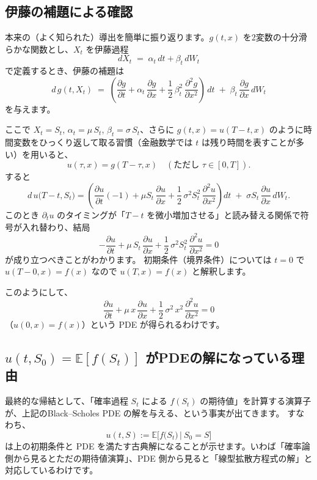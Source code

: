 \documentclass[a4paper]{jsarticle}
\begin{document}
\subsection{伊藤の補題による確認}  

本来の（よく知られた）導出を簡単に振り返ります。$g(t,x)$ を2変数の十分滑らかな関数とし、$X_t$ を伊藤過程  
\[  
  dX_t \;=\; \alpha_t\,dt + \beta_t\,dW_t  
\]  
で定義するとき、伊藤の補題は  
\[  
  d\,g(t,X_t)  
  \;=\;  
  \left(  
    \frac{\partial g}{\partial t}  
    + \alpha_t\,\frac{\partial g}{\partial x}  
    + \frac{1}{2}\,\beta_t^2\,\frac{\partial^2 g}{\partial x^2}  
  \right)\,dt  
  \;+\;  
  \beta_t\,\frac{\partial g}{\partial x}\,dW_t  
\]  
を与えます。  

ここで $X_t=S_t$, $\alpha_t = \mu\,S_t$, $\beta_t=\sigma\,S_t$、さらに $g(t,x)=u(T-t,x)$ のように時間変数をひっくり返して取る習慣（金融数学では $t$ は残り時間を表すことが多い）を用いると、  
\[  
  u(\tau,x)  
  =  
  g(T-\tau,x)  
  \quad(\text{ただし } \tau \in [0,T]).  
\]  
すると  
\[  
  d\,u\bigl(T-t,S_t\bigr)  
  =  
  \left(  
    \frac{\partial u}{\partial t}(-1)  
    + \mu S_t\,\frac{\partial u}{\partial x}  
    + \frac12\,\sigma^2 S_t^2\,\frac{\partial^2 u}{\partial x^2}  
  \right) dt  
  \;+\;  
  \sigma S_t \,\frac{\partial u}{\partial x}\,dW_t.  
\]  
このとき $\partial_t u$ のタイミングが「$T-t$ を微小増加させる」と読み替える関係で符号が入れ替わり、結局  
\[  
  - \frac{\partial u}{\partial t}  
  + \mu\,S_t \,\frac{\partial u}{\partial x}  
  + \frac{1}{2}\,\sigma^2 S_t^2\,\frac{\partial^2 u}{\partial x^2}  
  = 0  
\]  
が成り立つべきことがわかります。  
初期条件（境界条件）については $t=0$ で $u(T-0,x)=f(x)$ なので $u(T,x)=f(x)$ と解釈します。  

このようにして、  
\[  
  \frac{\partial u}{\partial t}  
  +   
  \mu\, x \,\frac{\partial u}{\partial x}  
  +  
  \frac12\,\sigma^2\,x^2\,\frac{\partial^2 u}{\partial x^2}  
  = 0  
\]  
（$u(0,x)=f(x)$）という PDE が得られるわけです。  

\subsection{$u(t,S_0)=\mathbb{E}[f(S_t)]$ がPDEの解になっている理由}  

最終的な帰結として、「確率過程 $S_t$ による $f(S_t)$ の期待値」を計算する演算子が、上記のBlack--Scholes PDE の解を与える、という事実が出てきます。  
すなわち、  
\[  
  u(t,S)   
  :=   
  \mathbb{E}\bigl[f\bigl(S_{t}\bigr)\,\big|\ S_0=S\bigr]  
\]  
は上の初期条件と PDE を満たす古典解になることが示せます。いわば「確率論側から見るとただの期待値演算」、PDE 側から見ると「線型拡散方程式の解」と対応しているわけです。  
\end{document}
